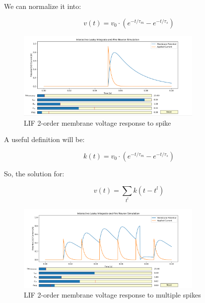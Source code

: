 We can normalize it into:

\begin{equation}
    v(t) = v_0 \cdot (e^{-t/\tau_m} - e^{-t/\tau_s})
\end{equation}

\begin{figure}[H]
    \centering
    \includegraphics[width=0.8\textwidth]{scientific-background/computational-models/LIF/graphs/LIF-second-order.png}
    \caption{LIF 2-order membrane voltage response to spike}
    \label{fig:LIF-second-order}
\end{figure}

A useful definition will be:

\begin{equation}
    k(t) = v_0 \cdot (e^{-t/\tau_m} - e^{-t/\tau_s})
\end{equation}

So, the solution for:

\begin{equation}
    v(t) = \sum_{t^l} k(t - t^l)
\end{equation}

\begin{figure}[H]
    \centering
    \includegraphics[width=0.8\textwidth]{scientific-background/computational-models/LIF/graphs/LIF-spike-response-second-order.png}
    \caption{LIF 2-order membrane voltage response to multiple spikes}
    \label{fig:LIF-second-order-spike-response}
\end{figure}
